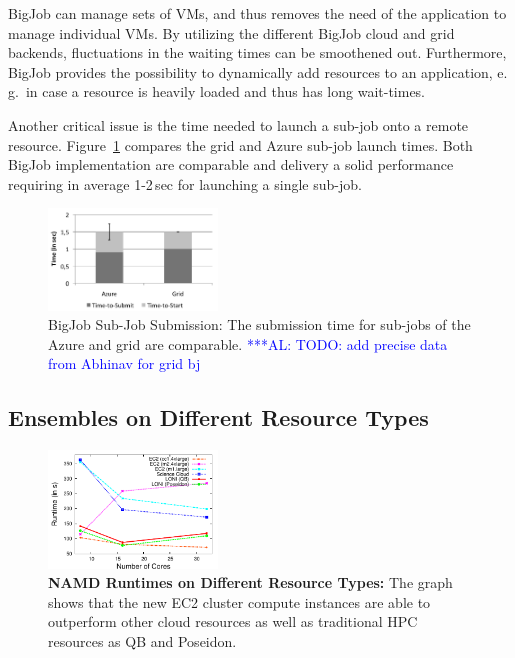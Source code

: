 \documentclass[conference,final]{IEEEtran}
\newcommand{\up}{\vspace*{-1em}}
\newcommand{\alnote}[1]{ {\textcolor{blue} { ***AL: #1 }}}
\newcommand{\alnote}[1]{}
\begin{document}
BigJob can manage sets of VMs, and thus removes the need of the
application to manage individual VMs. By utilizing the different
BigJob cloud and grid backends, fluctuations in the waiting times can
be smoothened out. Furthermore, BigJob provides the possibility to
dynamically add resources to an application, e.\,g.\ in case a
resource is heavily loaded and thus has long wait-times.

Another critical issue is the time needed to launch a sub-job onto
a remote resource. Figure~\ref{fig:performance_startup} compares
the grid and Azure sub-job launch times. Both BigJob implementation are
comparable and delivery a solid performance requiring in average
1-2\,sec for launching a single sub-job.
\begin{figure}[htbp]
    \centering
        \includegraphics[width=0.4\textwidth]{performance/startup.pdf}
    \caption{BigJob Sub-Job Submission: The submission time for sub-jobs 
    of the Azure  and grid are comparable. 
    \alnote{TODO: add precise data from Abhinav for grid bj}}
    \label{fig:performance_startup}
    \up\up
\end{figure}


\subsection{Ensembles on Different Resource Types}
\up
\label{sec:performance_namd}

\begin{figure}[t]
    \centering
        \includegraphics[width=0.4\textwidth]{performance/namd_run}
    \caption{\textbf{NAMD Runtimes on Different Resource Types: } The
          graph shows that the new EC2 cluster compute instances are 
          able to outperform other cloud resources as well as traditional
          HPC resources as QB and Poseidon.\up}
    \label{fig:performance_namd_run}

\end{figure}
\end{document}
